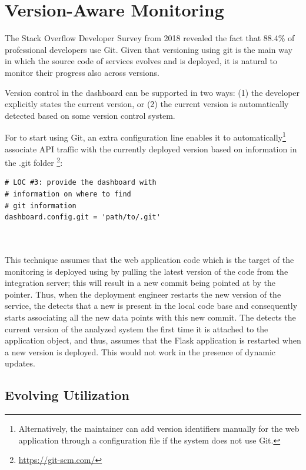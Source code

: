   
  \section{Version-Aware Monitoring}
    \label{sec:evolution}
  
  The Stack Overflow Developer Survey from 2018 revealed the fact that 88.4\% of professional developers use Git. 
  Given that versioning using git is the main way in which the source code of services evolves and is deployed, it is natural to monitor their progress also across versions. 

  Version control in the dashboard can be supported in two ways: 
  (1) the developer explicitly states the current version, or 
  (2) the current version is automatically detected based on some version control system. 

  For \tool to start using Git, an extra configuration line enables it to automatically\footnote{Alternatively, the maintainer can add version identifiers manually for the web application through a configuration file if the system does not use Git.} associate API traffic with the currently deployed version based on information in the .git folder \footnote{\url{https://git-scm.com/}}: 
    
\begin{lstlisting}[style=custompython]
# LOC #3: provide the dashboard with 
# information on where to find 
# git information 
dashboard.config.git = 'path/to/.git'
  
      
\end{lstlisting}  
 
    This technique assumes that the web application code which is the target of the monitoring is deployed using \git by pulling the latest version of the code from the integration server; this will result in a new commit being pointed at by the  pointer. Thus, when the deployment engineer restarts the new version of the service, the \tool detects that a new  is present in the local code base and consequently starts associating all the new data points with this new commit. The \tool detects the current version of the analyzed system the first time it is attached to the application object, and thus, assumes that the Flask application is restarted when a new version is deployed. This would not work in the presence of dynamic updates.

  

  \subsection*{Evolving Utilization}

